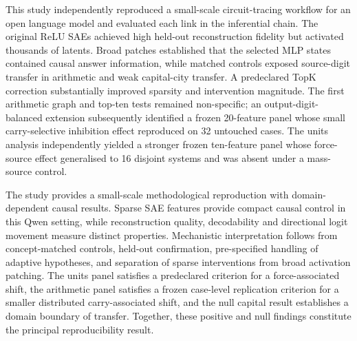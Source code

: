 \documentclass[11pt,a4paper]{article}
\begin{document}
This study independently reproduced a small-scale circuit-tracing workflow for an open language model and evaluated each link in the inferential chain. The original ReLU SAEs achieved high held-out reconstruction fidelity but activated thousands of latents. Broad patches established that the selected MLP states contained causal answer information, while matched controls exposed source-digit transfer in arithmetic and weak capital-city transfer. A predeclared TopK correction substantially improved sparsity and intervention magnitude. The first arithmetic graph and top-ten tests remained non-specific; an output-digit-balanced extension subsequently identified a frozen 20-feature panel whose small carry-selective inhibition effect reproduced on 32 untouched cases. The units analysis independently yielded a stronger frozen ten-feature panel whose force-source effect generalised to 16 disjoint systems and was absent under a mass-source control.

The study provides a small-scale methodological reproduction with domain-dependent causal results. Sparse SAE features provide compact causal control in this Qwen setting, while reconstruction quality, decodability and directional logit movement measure distinct properties. Mechanistic interpretation follows from concept-matched controls, held-out confirmation, pre-specified handling of adaptive hypotheses, and separation of sparse interventions from broad activation patching. The units panel satisfies a predeclared criterion for a force-associated shift, the arithmetic panel satisfies a frozen case-level replication criterion for a smaller distributed carry-associated shift, and the null capital result establishes a domain boundary of transfer. Together, these positive and null findings constitute the principal reproducibility result.
\end{document}

